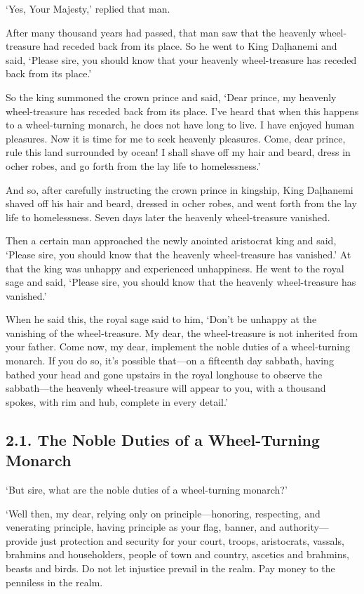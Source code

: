 \documentclass[12pt,openany]{book}%
\begin{document}
‘Yes, Your Majesty,’ replied that man. 

After many thousand years had passed, that man saw that the heavenly wheel-treasure had receded back from its place. So he went to King \textsanskrit{Daḷhanemi} and said, ‘Please sire, you should know that your heavenly wheel-treasure has receded back from its place.’ 

So the king summoned the crown prince and said, ‘Dear prince, my heavenly wheel-treasure has receded back from its place. I’ve heard that when this happens to a wheel-turning monarch, he does not have long to live. I have enjoyed human pleasures. Now it is time for me to seek heavenly pleasures. Come, dear prince, rule this land surrounded by ocean! I shall shave off my hair and beard, dress in ocher robes, and go forth from the lay life to homelessness.’ 

And so, after carefully instructing the crown prince in kingship, King \textsanskrit{Daḷhanemi} shaved off his hair and beard, dressed in ocher robes, and went forth from the lay life to homelessness. Seven days later the heavenly wheel-treasure vanished. 

Then a certain man approached the newly anointed aristocrat king and said, ‘Please sire, you should know that the heavenly wheel-treasure has vanished.’ At that the king was unhappy and experienced unhappiness. He went to the royal sage and said, ‘Please sire, you should know that the heavenly wheel-treasure has vanished.’ 

When he said this, the royal sage said to him, ‘Don’t be unhappy at the vanishing of the wheel-treasure. My dear, the wheel-treasure is not inherited from your father. Come now, my dear, implement the noble duties of a wheel-turning monarch. If you do so, it’s possible that—on a fifteenth day sabbath, having bathed your head and gone upstairs in the royal longhouse to observe the sabbath—the heavenly wheel-treasure will appear to you, with a thousand spokes, with rim and hub, complete in every detail.’ 

\subsection*{2.1. The Noble Duties of a Wheel-Turning Monarch }

‘But sire, what are the noble duties of a wheel-turning monarch?’ 

‘Well then, my dear, relying only on principle—honoring, respecting, and venerating principle, having principle as your flag, banner, and authority—provide just protection and security for your court, troops, aristocrats, vassals, brahmins and householders, people of town and country, ascetics and brahmins, beasts and birds. Do not let injustice prevail in the realm. Pay money to the penniless in the realm. 
\end{document}
